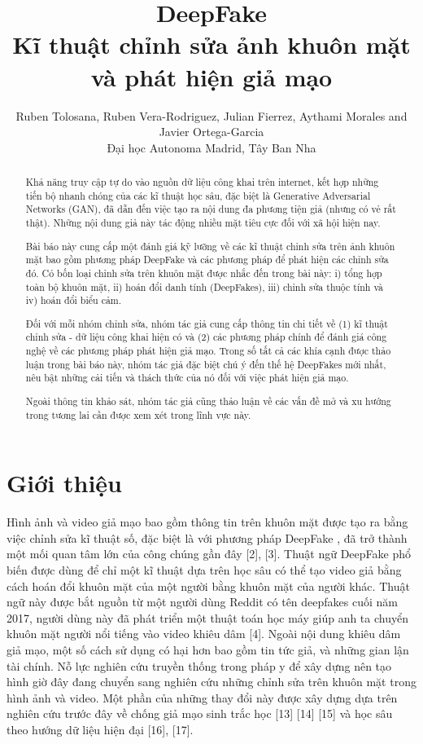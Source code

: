 \documentclass{article}
\title{DeepFake\\
Kĩ thuật chỉnh sửa ảnh khuôn mặt và phát hiện giả mạo}
\author{
Ruben Tolosana, Ruben Vera-Rodriguez, Julian Fierrez, Aythami Morales and Javier Ortega-Garcia\\
Đại học Autonoma Madrid, Tây Ban Nha
}
\begin{document}
\maketitle

\begin{abstract}

Khả năng truy cập tự do vào nguồn dữ liệu công khai trên internet, kết hợp những tiến bộ nhanh chóng của các kĩ thuật học sâu, đặc biệt là Generative Adversarial Networks (GAN), đã dẫn đến việc tạo ra nội dung đa phương tiện giả (nhưng có vẻ rất thật). Những nội dung giả này tác động nhiều mặt tiêu cực đối với xã hội hiện nay.

Bài báo này cung cấp một đánh giá kỹ lưỡng về các kĩ thuật chỉnh sửa trên ảnh khuôn mặt bao gồm phương pháp DeepFake và các phương pháp để phát hiện các chỉnh sửa đó. Có bốn loại chỉnh sửa trên khuôn mặt được nhắc đến trong bài này:
i) tổng hợp toàn bộ khuôn mặt,
ii) hoán đổi danh tính (DeepFakes),
iii) chỉnh sửa thuộc tính và
iv) hoán đổi biểu cảm.

Đối với mỗi nhóm chỉnh sửa, nhóm tác giả cung cấp thông tin chi tiết về (1) kĩ thuật chỉnh sửa - dữ liệu công khai hiện có và (2) các phương pháp chính để đánh giá công nghệ về các phương pháp phát hiện giả mạo. Trong số tất cả các khía cạnh được thảo luận trong bài báo này, nhóm tác giả đặc biệt chú ý đến thế hệ DeepFakes mới nhất, nêu bật những cải tiến và thách thức của nó đối với việc phát hiện giả mạo.

Ngoài thông tin khảo sát, nhóm tác giả cũng thảo luận về các vấn đề mở và xu hướng trong tương lai cần được xem xét trong lĩnh vực này.

\end{abstract}

\section{Giới thiệu} \label{sec:1-introduction}

Hình ảnh và video giả mạo bao gồm thông tin trên khuôn mặt được tạo ra bằng việc chỉnh sửa kĩ thuật số, đặc biệt là với phương pháp DeepFake \citet{pavel_2018}, đã trở thành một mối quan tâm lớn của công chúng gần đây [2], [3]. Thuật ngữ DeepFake phổ biến được dùng để chỉ một kĩ thuật dựa trên học sâu có thể tạo video giả bằng cách hoán đổi khuôn mặt của một người bằng khuôn mặt của người khác. Thuật ngữ này được bắt nguồn từ một người dùng Reddit có tên deepfakes cuối năm 2017, người dùng này đã phát triển một thuật toán học máy giúp anh ta chuyển khuôn mặt người nổi tiếng vào video khiêu dâm [4]. Ngoài nội dung khiêu dâm giả mạo, một số cách sử dụng có hại hơn bao gồm tin tức giả, và những gian lận tài chính.
Nỗ lực nghiên cứu truyền thống trong pháp y để xây dựng nên tạo hình giờ đây đang chuyển sang nghiên cứu những chỉnh sửa trên khuôn mặt trong hình ảnh và video. Một phần của những thay đổi này được xây dựng dựa trên nghiên cứu trước đây về chống giả mạo sinh trắc học [13] [14] [15] và học sâu theo hướng dữ liệu hiện đại [16], [17].
\end{document}
